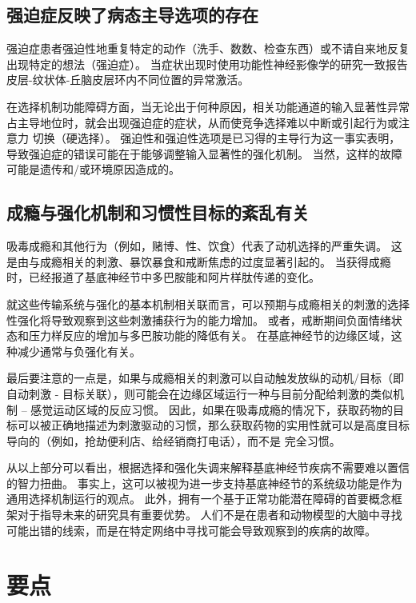 \subsection{强迫症反映了病态主导选项的存在}

强迫症患者强迫性地重复特定的动作（洗手、数数、检查东西）或不请自来地反复出现特定的想法（强迫症）。
当症状出现时使用功能性神经影像学的研究一致报告皮层-纹状体-丘脑皮层环内不同位置的异常激活。


在选择机制功能障碍方面，当无论出于何种原因，相关功能通道的输入显著性异常占主导地位时，就会出现强迫症的症状，从而使竞争选择难以中断或引起行为或注意力 切换（硬选择）。
强迫性和强迫性选项是已习得的主导行为这一事实表明，导致强迫症的错误可能在于能够调整输入显著性的强化机制。
当然，这样的故障可能是遗传和/或环境原因造成的。



\subsection{成瘾与强化机制和习惯性目标的紊乱有关}

吸毒成瘾和其他行为（例如，赌博、性、饮食）代表了动机选择的严重失调。
这是由与成瘾相关的刺激、暴饮暴食和戒断焦虑的过度显著引起的。
当获得成瘾时，已经报道了基底神经节中多巴胺能和阿片样肽传递的变化。


就这些传输系统与强化的基本机制相关联而言，可以预期与成瘾相关的刺激的选择性强化将导致观察到这些刺激捕获行为的能力增加。
或者，戒断期间负面情绪状态和压力样反应的增加与多巴胺功能的降低有关。
在基底神经节的边缘区域，这种减少通常与负强化有关。


最后要注意的一点是，如果与成瘾相关的刺激可以自动触发放纵的动机/目标（即自动刺激 - 目标关联），则可能会在边缘区域运行一种与目前分配给刺激的类似机制 – 感觉运动区域的反应习惯。
因此，如果在吸毒成瘾的情况下，获取药物的目标可以被正确地描述为刺激驱动的习惯，那么获取药物的实用性就可以是高度目标导向的（例如，抢劫便利店、给经销商打电话），而不是 完全习惯。


从以上部分可以看出，根据选择和强化失调来解释基底神经节疾病不需要难以置信的智力扭曲。
事实上，这可以被视为进一步支持基底神经节的系统级功能是作为通用选择机制运行的观点。
此外，拥有一个基于正常功能潜在障碍的首要概念框架对于指导未来的研究具有重要优势。
人们不是在患者和动物模型的大脑中寻找可能出错的线索，而是在特定网络中寻找可能会导致观察到的疾病的故障。



\section{要点}

